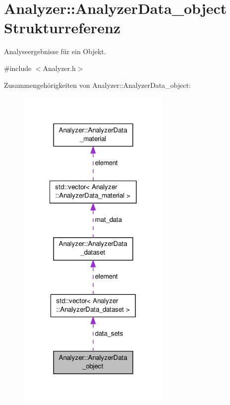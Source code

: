 \hypertarget{structAnalyzer_1_1AnalyzerData__object}{\section{Analyzer\-:\-:Analyzer\-Data\-\_\-object Strukturreferenz}
\label{structAnalyzer_1_1AnalyzerData__object}
}


Analyseergebnisse für ein Objekt.  




{\ttfamily \#include $<$Analyzer.\-h$>$}



Zusammengehörigkeiten von Analyzer\-:\-:Analyzer\-Data\-\_\-object\-:\nopagebreak
\begin{figure}[H]
\begin{center}
\leavevmode
\includegraphics[width=210pt]{structAnalyzer_1_1AnalyzerData__object__coll__graph}
\end{center}
\end{figure}
